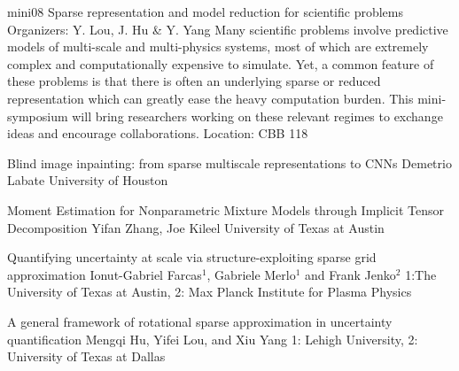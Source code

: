 \mini
{mini08}
{Sparse representation and model reduction for scientific problems}
{Organizers: Y. Lou, J. Hu \& Y. Yang}
{Many scientific problems involve predictive models of multi-scale and multi-physics systems, most of which are extremely complex and computationally expensive to simulate. Yet, a common feature of these problems is that there is often an underlying sparse or reduced representation which can greatly ease the heavy computation burden. This mini-symposium will bring researchers working on these relevant regimes to exchange ideas and encourage collaborations.}
{Location: CBB 118}

\begin{talks}
\item\talk
{Blind image inpainting: from sparse multiscale representations to CNNs}
{Demetrio Labate}
{University of Houston}
\item\talk
{Moment Estimation for Nonparametric Mixture Models through Implicit Tensor Decomposition}
{Yifan Zhang, Joe Kileel}
{University of Texas at Austin}
\item\talk
{Quantifying uncertainty at scale via structure-exploiting sparse grid approximation}
{Ionut-Gabriel Farcas$^{1}$, Gabriele Merlo$^{1}$ and Frank Jenko$^{2}$}
{1:The University of Texas at Austin, 2: Max Planck Institute for Plasma Physics}\item\talk
{A general framework of rotational sparse approximation in uncertainty quantification}
{Mengqi Hu, Yifei Lou, and Xiu Yang}
{1: Lehigh University, 2: University of Texas at Dallas}
\end{talks}
\room
